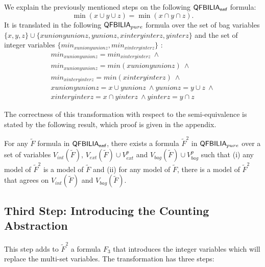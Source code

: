 \begin{myex}
We explain the previously mentioned steps on the following $\textsf{QFBILIA}_{\textsf{nnf}}$ formula:
$$\min(x \cup y \cup z) = \min(x \cap y \cap z).$$ 
It is translated in the following $\textsf{QFBILIA}_{pure}$ formula over the set of bag variables $\{x,y,z\}\cup\{xunionyunionz,yunionz,xinteryinterz,yinterz\}$
and the set of integer variables $\{min_{xunionyunionz},min_{xinteryinterz}\}$ :
\begin{align*}
min_{xunionyunionz} = min_{xinteryinterz} \ \land \\
  min_{xunionyunionz} = min(xunionyunionz) \  \land \\
  min_{xinteryinterz} = min(xinteryinterz) \ \land \\
  xunionyunionz = x \cup yunionz \ \land
  yunionz = y \cup z \ \land \\
  xinteryinterz = x \cap yinterz \ \land
  yinterz = y \cap z
\end{align*}
\end{myex}

The correctness of this transformation with respect to the semi-equivalence  is stated by the following result, which proof is given in the appendix.

\begin{myprop}
\label{prop:pure}
For any $\tilde{F}$ formula in $\textsf{QFBILIA}_{\textsf{nnf}}$, there exists a formula $\tilde{F}^2$ in $\textsf{QFBILIA}_{pure}$ over a set of variables
$V_{int}(\tilde{F})$, $V_{ext}(\tilde{F})\cup V^p_{ext}$ and $V_{bag}(\tilde{F})\cup V^p_{bag}$ such that
(i) any model of $\tilde{F}^2$ is a model of $\tilde{F}$ and
(ii) for any model of $\tilde{F}$, there is a model of $\tilde{F}^2$ that agrees on $V_{int}(\tilde{F})$ and $V_{bag}(\tilde{F})$.
\end{myprop}


\subsection{Third Step: Introducing the Counting Abstraction}

This step adds to $\tilde{F}^2$ a formula $F_3$ that introduces the integer variables which will replace the multi-set variables. The transformation has three steps:

